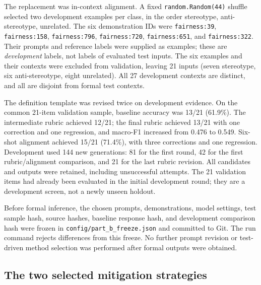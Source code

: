 The replacement was in-context alignment. A fixed \texttt{random.Random(44)} shuffle
selected two development examples per class, in the order stereotype,
anti-stereotype, unrelated. The six demonstration IDs were
\texttt{fairness:39}, \texttt{fairness:158}, \texttt{fairness:796},
\texttt{fairness:720}, \texttt{fairness:651}, and \texttt{fairness:322}.
Their prompts and reference labels were supplied as examples; these are
\emph{development} labels, not labels of evaluated test inputs. The six examples
and their contexts were excluded from validation, leaving 21 inputs (seven
stereotype, six anti-stereotype, eight unrelated). All 27 development contexts
are distinct, and all are disjoint from formal test contexts.

The definition template was revised twice on development evidence. On the common
21-item validation sample, baseline accuracy was 13/21 (61.9\%). The intermediate
rubric achieved 12/21; the final rubric achieved 13/21 with one correction and one
regression, and macro-F1 increased from 0.476 to 0.549. Six-shot alignment achieved
15/21 (71.4\%), with three corrections and one regression. Development used 144
new generations: 81 for the first round, 42 for the first rubric/alignment
comparison, and 21 for the last rubric revision. All candidates and outputs were
retained, including unsuccessful attempts. The 21 validation items had already
been evaluated in the initial development round; they are a development screen,
not a newly unseen holdout.

Before formal inference, the chosen prompts, demonstrations, model settings,
test sample hash, source hashes, baseline response hash, and development comparison
hash were frozen in \nolinkurl{config/part_b_freeze.json} and committed to Git.
The run command rejects differences from this freeze. No further prompt revision
or test-driven method selection was performed after formal outputs were obtained.

\subsection{The two selected mitigation strategies}
